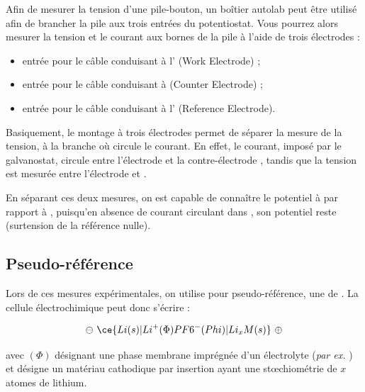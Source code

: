 
Afin de mesurer la tension d'une pile-bouton, un boîtier autolab peut être utilisé afin de brancher la pile aux trois entrées du potentiostat. Vous pourrez alors mesurer la tension et le courant aux bornes de la pile à l'aide de trois électrodes :
\begin{itemize}
    \item[\blancbis{WE}] entrée pour le câble conduisant à l' (Work Electrode) ;
    \item[\blancbis{CE}] entrée pour le câble conduisant à  (Counter Electrode) ; 
    \item[\blancbis{RE}] entrée pour le câble conduisant à l' (Reference Electrode). 
\end{itemize}

Basiquement, le montage à trois électrodes permet de séparer la mesure de la tension, à la branche où circule le courant. En effet, le courant, imposé par le galvanostat, circule entre l'électrode  et la contre-électrode , tandis que la tension est mesurée entre l’électrode  et .

En séparant ces deux mesures, on est capable de connaître le potentiel à  par rapport à , puisqu'en absence de courant circulant dans , son potentiel reste  (surtension de la référence nulle).

\subsection{Pseudo-référence}

Lors de ces mesures expérimentales, on utilise pour pseudo-référence, une  de . La cellule électrochimique peut donc s'écrire :

\begin{align*}
\ominus ~ \ce{Li(s) | Li^+ (\Phi) PF6^- (Phi) | Li_x M (s)} ~ \oplus
\end{align*}

avec $(\Phi)$ désignant une phase membrane imprégnée d'un électrolyte (\emph{par ex.} ) et  désigne un matériau cathodique par insertion ayant une st{\oe}chiométrie de $x$ atomes de lithium.

